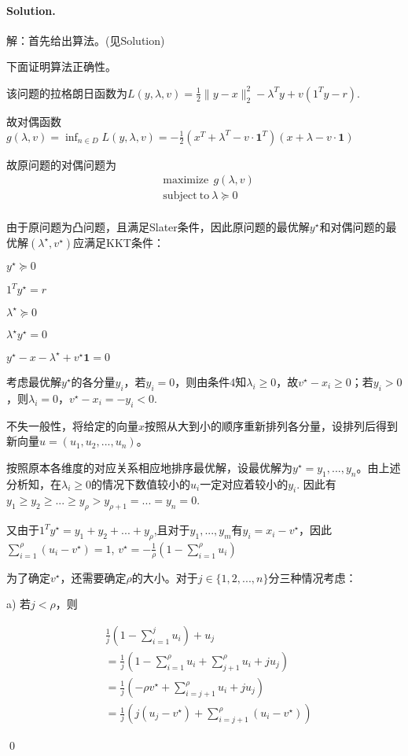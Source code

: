 \documentclass[a4paper]{article}
\newenvironment{solution}
{\color{blue} \paragraph{Solution.}}
{\newline \qed}
\begin{document}
\begin{solution}
    解：首先给出算法。(见Solution)

    下面证明算法正确性。

    该问题的拉格朗日函数为$L(y, \lambda, v)=\frac 12\|y-x\|_2^2-\lambda^T y+v(1^Ty-r)$.

    故对偶函数$g(\lambda, v)=\inf_{n\in D}L(y, \lambda, v)=-\frac 12(x^T+\lambda^T-v\cdot \mathbf{1}^T)(x+\lambda-v\cdot \mathbf{1})$

    故原问题的对偶问题为
        \begin{equation}
            \begin{split}
                &\text{maximize}\ \ g(\lambda, v)\\
                &\text{subject}\ \text{to}\ \lambda\succeq 0\\
            \end{split}
        \end{equation}

    由于原问题为凸问题，且满足Slater条件，因此原问题的最优解$y^\star$和对偶问题的最优解$(\lambda^\star, v^\star)$应满足KKT条件：

    $y^\star\succeq 0$

    $1^Ty^\star=r$

    $\lambda^\star\succeq 0$

    $\lambda^\star y^\star=0$

    $y^\star-x-\lambda^\star+v^\star \mathbf{1}=0$

    考虑最优解$y^\star$的各分量$y_i$，若$y_i=0$，则由条件4知$\lambda_i \geq0$，故$v^\star -x_i\geq 0$；若$y_i >0$，则$\lambda_i=0$，$v^\star -x_i =-y_i<0$.

    不失一般性，将给定的向量$x$按照从大到小的顺序重新排列各分量，设排列后得到新向量$u=(u_1, u_2, ...,u_n)$。
    
    按照原本各维度的对应关系相应地排序最优解，设最优解为$y^\star={y_1, ...,y_n}$。由上述分析知，在$\lambda_i\geq 0$的情况下数值较小的$u_i$一定对应着较小的$y_i$. 因此有$y_1\geq y_2\geq ...\geq y_{\rho} > y_{\rho+1}=...=y_n=0$.

    又由于$1^Ty^\star=y_1+y_2+...+y_{\rho}$,且对于$y_1, ...,y_m$有$y_i=x_i-v^\star$，因此$\sum_{i=1}^\rho(u_i-v^\star)=1$, $v^\star=-\frac 1\rho (1-\sum_{i=1}^\rho u_i)$

    为了确定$v^\star$，还需要确定$\rho$的大小。对于$j\in\{1, 2, ...,n\}$分三种情况考虑：

    a) 若$j<\rho$，则

    \begin{equation}
        \begin{split}
            &\frac 1j(1-\sum_{i=1}^ju_i)+u_j\\
            &=\frac 1j(1-\sum_{i=1}^\rho u_i+\sum_{j+1}^\rho u_i+ju_j)\\
            &=\frac 1j(-\rho v^\star+\sum_{i=j+1}^\rho u_i+ju_j)\\
            &=\frac 1j(j(u_j-v^\star)+\sum_{i=j+1}^\rho(u_i-v^\star))
        \end{split}
    \end{equation}
        

\end{solution}
\end{document}
